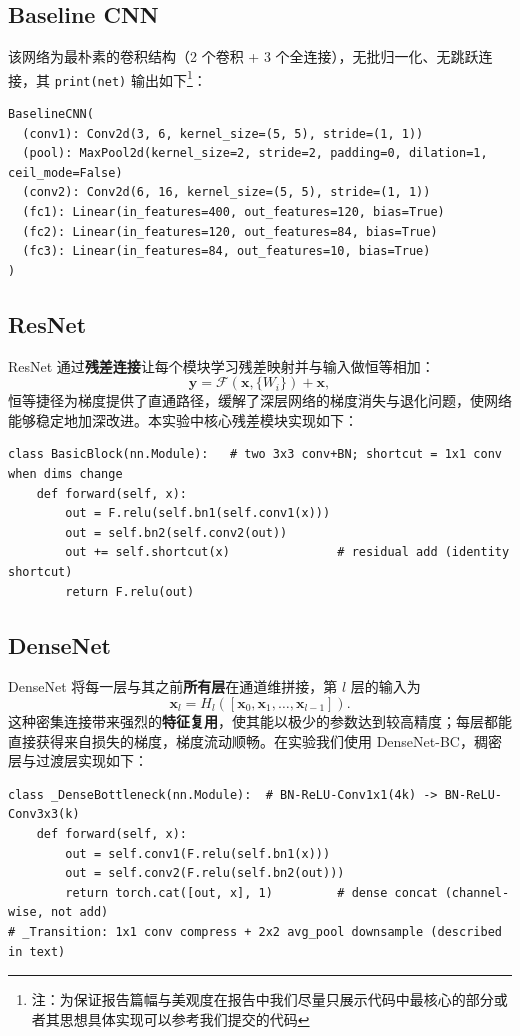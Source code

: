 \documentclass[a4paper]{article}
\begin{document}
\subsection{Baseline CNN}
该网络为最朴素的卷积结构（2 个卷积 + 3 个全连接），无批归一化、无跳跃连接，其 \texttt{print(net)} 输出如下\footnote{注：为保证报告篇幅与美观度在报告中我们尽量只展示代码中最核心的部分或者其思想具体实现可以参考我们提交的代码}：
\begin{lstlisting}
BaselineCNN(
  (conv1): Conv2d(3, 6, kernel_size=(5, 5), stride=(1, 1))
  (pool): MaxPool2d(kernel_size=2, stride=2, padding=0, dilation=1, ceil_mode=False)
  (conv2): Conv2d(6, 16, kernel_size=(5, 5), stride=(1, 1))
  (fc1): Linear(in_features=400, out_features=120, bias=True)
  (fc2): Linear(in_features=120, out_features=84, bias=True)
  (fc3): Linear(in_features=84, out_features=10, bias=True)
)
\end{lstlisting}

\subsection{ResNet}
ResNet 通过\textbf{残差连接}让每个模块学习残差映射并与输入做恒等相加：
\begin{equation}
  \bm{y} = \mathcal{F}(\bm{x}, \{W_i\}) + \bm{x},
\end{equation}
恒等捷径为梯度提供了直通路径，缓解了深层网络的梯度消失与退化问题，使网络能够稳定地加深改进。本实验中核心残差模块实现如下：
\begin{lstlisting}
class BasicBlock(nn.Module):   # two 3x3 conv+BN; shortcut = 1x1 conv when dims change
    def forward(self, x):
        out = F.relu(self.bn1(self.conv1(x)))
        out = self.bn2(self.conv2(out))
        out += self.shortcut(x)               # residual add (identity shortcut)
        return F.relu(out)
\end{lstlisting}

\subsection{DenseNet}
DenseNet 将每一层与其之前\textbf{所有层}在通道维拼接，第 $l$ 层的输入为
\begin{equation}
  \bm{x}_l = H_l\!\left([\bm{x}_0, \bm{x}_1, \dots, \bm{x}_{l-1}]\right).
\end{equation}
这种密集连接带来强烈的\textbf{特征复用}，使其能以极少的参数达到较高精度；每层都能直接获得来自损失的梯度，梯度流动顺畅。在实验我们使用 DenseNet-BC，稠密层与过渡层实现如下：
\begin{lstlisting}
class _DenseBottleneck(nn.Module):  # BN-ReLU-Conv1x1(4k) -> BN-ReLU-Conv3x3(k)
    def forward(self, x):
        out = self.conv1(F.relu(self.bn1(x)))
        out = self.conv2(F.relu(self.bn2(out)))
        return torch.cat([out, x], 1)         # dense concat (channel-wise, not add)
# _Transition: 1x1 conv compress + 2x2 avg_pool downsample (described in text)
\end{lstlisting}
\end{document}
